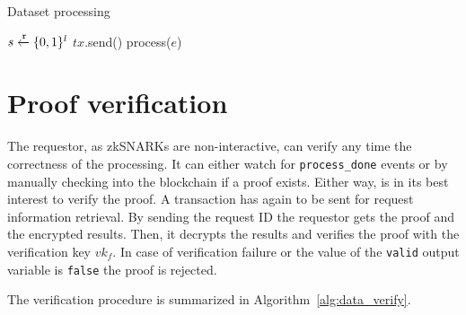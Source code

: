 \begin{algorithm}[!htb]
  \caption{Dataset processing}\label{alg:data_processing}
  \begin{algorithmic}[1]
     
     
     
     
     
    \State $s \xleftarrow{\mathtt{r}}{\{0, 1\}^{l}}$ 
     
     
     
     
    \State $tx$.send()
  \EndProcedure
     
      \State process($e$) 
    \EndWhile
  \EndProcedure
  \end{algorithmic}
\end{algorithm}

\section{Proof verification}
\label{solution:flow:verify}

The requestor, as zkSNARKs are non-interactive, can verify any time the correctness of the processing. It can either watch for \verb|process_done| events or by manually checking into the blockchain if a proof exists. Either way, is in its best interest to verify the proof. A transaction has again to be sent for request information retrieval. By sending the request ID the requestor gets the proof and the encrypted results. Then, it decrypts the results and verifies the proof with the verification key $vk_f$. In case of verification failure or the value of the \verb|valid| output variable is \verb|false| the proof is rejected.

The verification procedure is summarized in Algorithm~\ref{alg:data_verify}.

